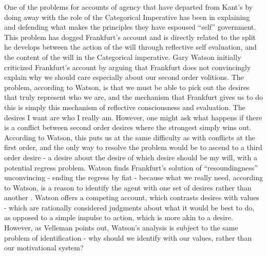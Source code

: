 \documentclass[phd,12pt,oneside,paper=letterpaper]{ubcthesis}
\begin{document}
One of the problems for accounts of agency that have departed from Kant's by doing away with the role of the Categorical Imperative has been in explaining and defending what makes the principles they have espoused ``self'' government. This problem has dogged Frankfurt's account and is directly related to the split he develops between the action of the will through reflective self evaluation, and the content of the will in the Categorical imperative. Gary Watson \citeyearpar{watson1986} initially criticized Frankfurt's account by arguing that Frankfurt does not convincingly explain why we should care especially about our second order volitions. The problem, according to Watson, is that we must be able to pick out the desires that truly represent who we are, and the mechanism that Frankfurt gives us to do this is simply this mechanism of reflective consciousness and evaluation. The desires I want are who I really am. However, one might ask what happens if there is a conflict between second order desires where the strongest simply wins out. According to Watson, this puts us at the same difficulty as with conflicts at the first order, and the only way to resolve the problem would be to ascend to a third order desire - a desire about the desire of which desire should be my will, with a potential regress problem. Watson finds Frankfurt's solution of ``resoundingness'' unconvincing - ending the regress by fiat - because what we really need, according to Watson, is a reason to identify the agent with one set of desires rather than another \citep[p 94]{watson1986}. Watson offers a competing account, which contrasts desires with values - which are rationally considered judgments about what it would be best to do, as opposed to a simple impulse to action, which is more akin to a desire. \citep[p.91]{watson1986} However, as Velleman \citeyearpar{velleman1992} points out, Watson's analysis is subject to the same problem of identification - why should we identify with our values, rather than our motivational system?
\end{document}
